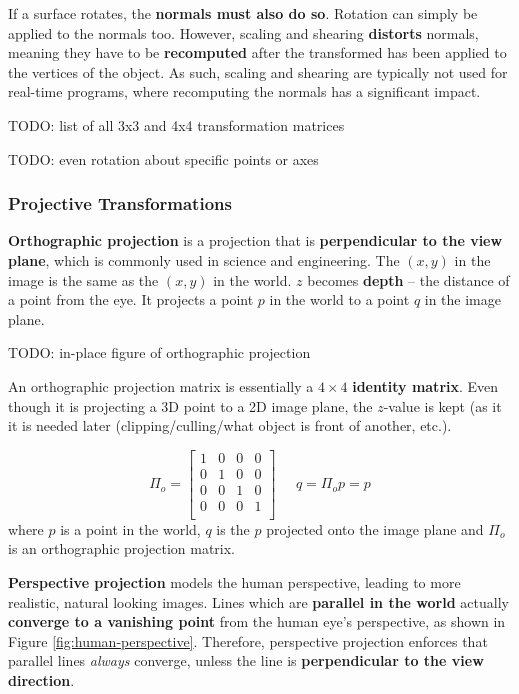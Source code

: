 \documentclass{article}
\begin{document}
If a surface rotates, the \textbf{normals must also do so}. Rotation can simply be applied to the normals too. However, scaling and shearing \textbf{distorts} normals, meaning they have to be \textbf{recomputed} after the transformed has been applied to the vertices of the object. As such, scaling and shearing are typically not used for real-time programs, where recomputing the normals has a significant impact.

TODO: list of all 3x3 and 4x4 transformation matrices

TODO: even rotation about specific points or axes

\subsubsection{Projective Transformations}

\textbf{Orthographic projection} is a projection that is \textbf{perpendicular to the view plane}, which is commonly used in science and engineering. The $(x, y)$ in the image is the same as the $(x, y)$ in the world. $z$ becomes \textbf{depth} -- the distance of a point from the eye. It projects a point $p$ in the world to a point $q$ in the image plane.

TODO: in-place figure of orthographic projection

An orthographic projection matrix is essentially a $4 \times 4$ \textbf{identity matrix}. Even though it is projecting a 3D point to a 2D image plane, the $z$-value is kept (as it it is needed later (clipping/culling/what object is front of another, etc.).

\begin{equation}
	\Pi_o = \left[ \begin{matrix}
		1 & 0 & 0 & 0 \\
		0 & 1 & 0 & 0 \\
		0 & 0 & 1 & 0 \\
		0 & 0 & 0 & 1 \\
	\end{matrix} \right]
	\;\;\;\;\; q = \Pi_o p = p
	\label{eq:orthographic-projection}
\end{equation}
where $p$ is a point in the world, $q$ is the $p$ projected onto the image plane and $\Pi_o$ is an orthographic projection matrix.

\textbf{Perspective projection} models the human perspective, leading to more realistic, natural looking images. Lines which are \textbf{parallel in the world} actually \textbf{converge to a vanishing point} from the human eye's perspective, as shown in Figure \ref{fig:human-perspective}. Therefore, perspective projection enforces that parallel lines \textit{always} converge, unless the line is \textbf{perpendicular to the view direction}.
\end{document}
